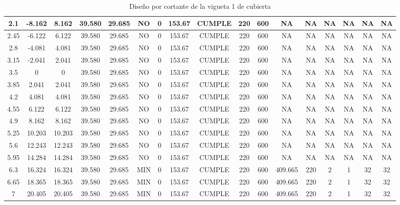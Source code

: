 \begin{table}[h]
{\begin{tabular}{|c|c|c|c|c|c|c|c|c|c|c|c|c|c|c|c|c|}
    \hline
    2.1 & -8.162 & 8.162 & 39.580 & 29.685 & NO  & 0   & 153.67 & CUMPLE & 220 & 600 & NA  & NA  & NA  & NA  & NA  & NA \bigstrut\\
    \hline
    2.45 & -6.122 & 6.122 & 39.580 & 29.685 & NO  & 0   & 153.67 & CUMPLE & 220 & 600 & NA  & NA  & NA  & NA  & NA  & NA \bigstrut\\
    \hline
    2.8 & -4.081 & 4.081 & 39.580 & 29.685 & NO  & 0   & 153.67 & CUMPLE & 220 & 600 & NA  & NA  & NA  & NA  & NA  & NA \bigstrut\\
    \hline
    3.15 & -2.041 & 2.041 & 39.580 & 29.685 & NO  & 0   & 153.67 & CUMPLE & 220 & 600 & NA  & NA  & NA  & NA  & NA  & NA \bigstrut\\
    \hline
    3.5 & 0   & 0   & 39.580 & 29.685 & NO  & 0   & 153.67 & CUMPLE & 220 & 600 & NA  & NA  & NA  & NA  & NA  & NA \bigstrut\\
    \hline
    3.85 & 2.041 & 2.041 & 39.580 & 29.685 & NO  & 0   & 153.67 & CUMPLE & 220 & 600 & NA  & NA  & NA  & NA  & NA  & NA \bigstrut\\
    \hline
    4.2 & 4.081 & 4.081 & 39.580 & 29.685 & NO  & 0   & 153.67 & CUMPLE & 220 & 600 & NA  & NA  & NA  & NA  & NA  & NA \bigstrut\\
    \hline
    4.55 & 6.122 & 6.122 & 39.580 & 29.685 & NO  & 0   & 153.67 & CUMPLE & 220 & 600 & NA  & NA  & NA  & NA  & NA  & NA \bigstrut\\
    \hline
    4.9 & 8.162 & 8.162 & 39.580 & 29.685 & NO  & 0   & 153.67 & CUMPLE & 220 & 600 & NA  & NA  & NA  & NA  & NA  & NA \bigstrut\\
    \hline
    5.25 & 10.203 & 10.203 & 39.580 & 29.685 & NO  & 0   & 153.67 & CUMPLE & 220 & 600 & NA  & NA  & NA  & NA  & NA  & NA \bigstrut\\
    \hline
    5.6 & 12.243 & 12.243 & 39.580 & 29.685 & NO  & 0   & 153.67 & CUMPLE & 220 & 600 & NA  & NA  & NA  & NA  & NA  & NA \bigstrut\\
    \hline
    5.95 & 14.284 & 14.284 & 39.580 & 29.685 & NO  & 0   & 153.67 & CUMPLE & 220 & 600 & NA  & NA  & NA  & NA  & NA  & NA \bigstrut\\
    \hline
    6.3 & 16.324 & 16.324 & 39.580 & 29.685 & MIN & 0   & 153.67 & CUMPLE & 220 & 600 & 409.665 & 220 & 2   & 1   & 32  & 32 \bigstrut\\
    \hline
    6.65 & 18.365 & 18.365 & 39.580 & 29.685 & MIN & 0   & 153.67 & CUMPLE & 220 & 600 & 409.665 & 220 & 2   & 1   & 32  & 32 \bigstrut\\
    \hline
    7   & 20.405 & 20.405 & 39.580 & 29.685 & MIN & 0   & 153.67 & CUMPLE & 220 & 600 & 409.665 & 220 & 2   & 1   & 32  & 32 \bigstrut\\
    \hline
    \end{tabular}}%
    \caption{Diseño por cortante de la vigueta 1 de cubierta}
  \label{tab:CORT VT1 CUB}%
\end{table}%
